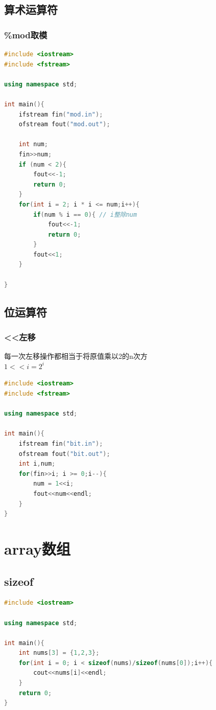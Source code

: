 \documentclass[12pt,twiside,a4paper]{ctexbook}
\numberwithin{chapter}{part}
\begin{document}
\section{算术运算符}
\subsection{\%mod取模}
\begin{lstlisting}[language=C++]
#include <iostream>
#include <fstream>

using namespace std;

int main(){
	ifstream fin("mod.in");
	ofstream fout("mod.out");
	
	int num;
	fin>>num;
	if (num < 2){
		fout<<-1;
		return 0;
	}
	for(int i = 2; i * i <= num;i++){
		if(num % i == 0){ // i整除num
			fout<<-1;
			return 0; 
		}
		fout<<1;
	}

}
\end{lstlisting}

\section{位运算符}
\subsection{<<左移}
每一次左移操作都相当于将原值乘以2的n次方\\
$1<<i = 2^i$
\begin{lstlisting}[language=C++]
#include <iostream>
#include <fstream>

using namespace std;

int main(){
	ifstream fin("bit.in");
	ofstream fout("bit.out");
	int i,num;
	for(fin>>i; i >= 0;i--){
		num = 1<<i; 
		fout<<num<<endl;
	}
}
\end{lstlisting}

\chapter{array数组}
\section{sizeof}
\begin{lstlisting}[language=C++]
#include <iostream>

using namespace std;

int main(){
	int nums[3] = {1,2,3};
	for(int i = 0; i < sizeof(nums)/sizeof(nums[0]);i++){
		cout<<nums[i]<<endl;
	}
	return 0;
}
\end{lstlisting}
\end{document}
